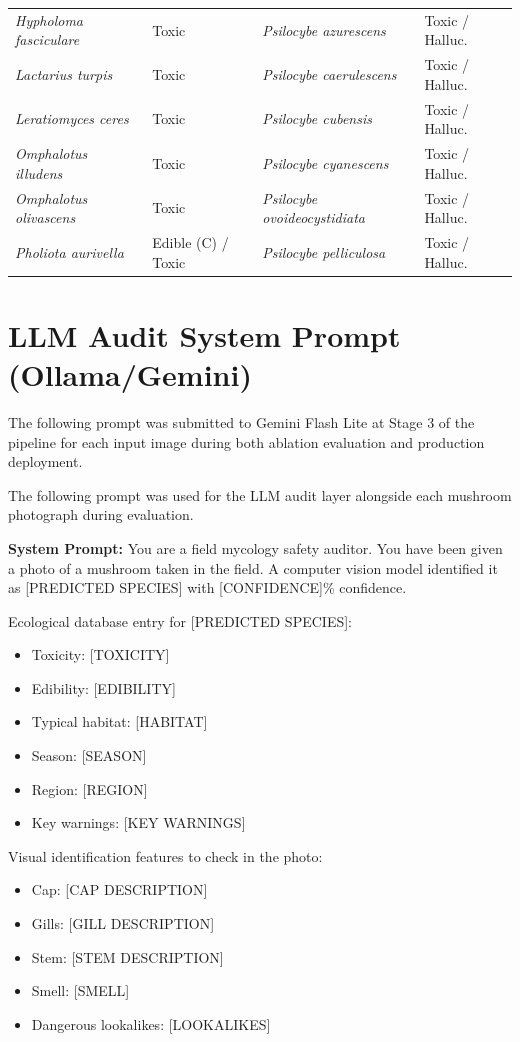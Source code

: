 \documentclass[journal,transmag]{IEEEtran}
\begin{document}
\begin{table}[h]
\begin{tabular}{@{}llll@{}}
\textit{Hypholoma fasciculare} & Toxic & \textit{Psilocybe azurescens} & Toxic / Halluc. \\
\textit{Lactarius turpis} & Toxic & \textit{Psilocybe caerulescens} & Toxic / Halluc. \\
\textit{Leratiomyces ceres} & Toxic & \textit{Psilocybe cubensis} & Toxic / Halluc. \\
\textit{Omphalotus illudens} & Toxic & \textit{Psilocybe cyanescens} & Toxic / Halluc. \\
\textit{Omphalotus olivascens} & Toxic & \textit{Psilocybe ovoideocystidiata} & Toxic / Halluc. \\
\textit{Pholiota aurivella} & Edible (C) / Toxic & \textit{Psilocybe pelliculosa} & Toxic / Halluc. \\
\hline
\end{tabular}%
\end{table}






\section{\textbf{LLM Audit System Prompt (Ollama/Gemini})}
\label{app:llm-prompt}

The following prompt was submitted to Gemini Flash Lite at Stage 3 of the pipeline for each input image during both ablation evaluation and production deployment.

The following prompt was used for the LLM audit layer alongside each mushroom photograph during evaluation.

\textbf{System Prompt:} You are a field mycology safety auditor. You have been given a photo of a mushroom taken in the field. A computer vision model identified it as [PREDICTED SPECIES] with [CONFIDENCE]\% confidence.

Ecological database entry for [PREDICTED SPECIES]:
\begin{itemize}
    \item Toxicity: [TOXICITY]
    \item Edibility: [EDIBILITY]
    \item Typical habitat: [HABITAT]
    \item Season: [SEASON]
    \item Region: [REGION]
    \item Key warnings: [KEY WARNINGS]
\end{itemize}

Visual identification features to check in the photo:
\begin{itemize}
    \item Cap: [CAP DESCRIPTION]
    \item Gills: [GILL DESCRIPTION]
    \item Stem: [STEM DESCRIPTION]
    \item Smell: [SMELL]
    \item Dangerous lookalikes: [LOOKALIKES]
\end{itemize}
\end{document}
